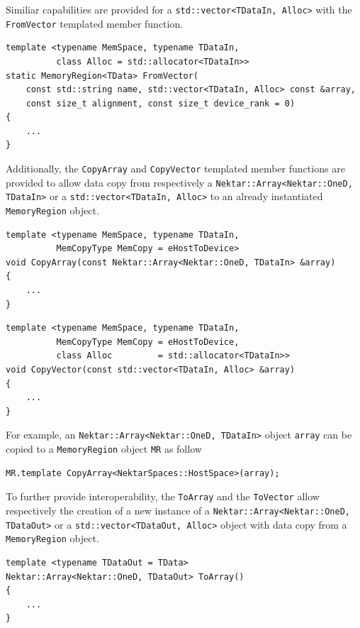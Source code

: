 Similiar capabilities are provided for a \lstinline[style=C++Style]!std::vector<TDataIn, Alloc>! with the \lstinline[style=C++Style]!FromVector! templated member function.
\begin{lstlisting}[style=C++Style]
template <typename MemSpace, typename TDataIn,
          class Alloc = std::allocator<TDataIn>>
static MemoryRegion<TData> FromVector(
    const std::string name, std::vector<TDataIn, Alloc> const &array,
    const size_t alignment, const size_t device_rank = 0)
{
    ...
}
\end{lstlisting}

Additionally, the \lstinline[style=C++Style]!CopyArray! and \lstinline[style=C++Style]!CopyVector! templated member functions are provided to allow data copy from respectively a \lstinline[style=C++Style]!Nektar::Array<Nektar::OneD, TDataIn>! or a \lstinline[style=C++Style]!std::vector<TDataIn, Alloc>! to an already instantiated \lstinline[style=C++Style]!MemoryRegion! object.
\begin{lstlisting}[style=C++Style]
template <typename MemSpace, typename TDataIn,
          MemCopyType MemCopy = eHostToDevice>
void CopyArray(const Nektar::Array<Nektar::OneD, TDataIn> &array)
{
    ...
}
\end{lstlisting}

\begin{lstlisting}[style=C++Style]
template <typename MemSpace, typename TDataIn,
          MemCopyType MemCopy = eHostToDevice,
          class Alloc         = std::allocator<TDataIn>>
void CopyVector(const std::vector<TDataIn, Alloc> &array)
{
    ...
}
\end{lstlisting}

For example, an \lstinline[style=C++Style]!Nektar::Array<Nektar::OneD, TDataIn>! object \lstinline[style=C++Style]!array! can be copied to a \lstinline[style=C++Style]!MemoryRegion! object \lstinline[style=C++Style]!MR! as follow
\begin{lstlisting}[style=C++Style]
MR.template CopyArray<NektarSpaces::HostSpace>(array);
\end{lstlisting}

To further provide interoperability, the \lstinline[style=C++Style]!ToArray! and the \lstinline[style=C++Style]!ToVector! allow respectively the creation of a new instance of a \lstinline[style=C++Style]!Nektar::Array<Nektar::OneD, TDataOut>! or a \lstinline[style=C++Style]!std::vector<TDataOut, Alloc>! object with data copy from a \lstinline[style=C++Style]!MemoryRegion! object.
\begin{lstlisting}[style=C++Style]
template <typename TDataOut = TData>
Nektar::Array<Nektar::OneD, TDataOut> ToArray()
{
    ...
}
\end{lstlisting}

